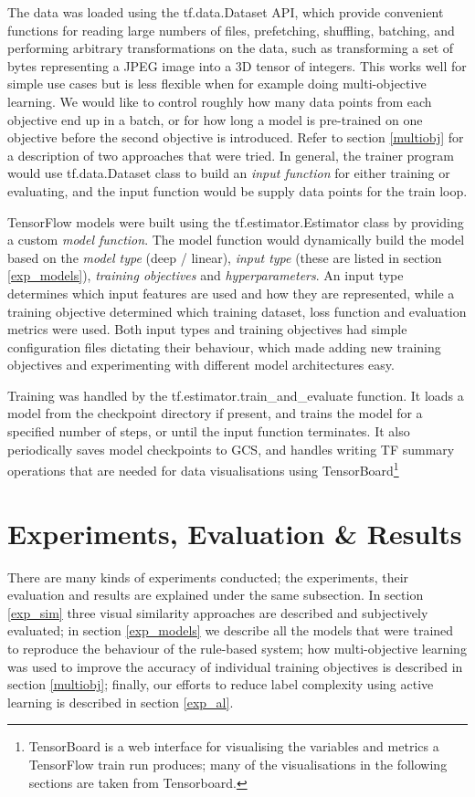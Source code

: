 The data was loaded using the tf.data.Dataset API, which provide convenient functions for reading large numbers of files, prefetching, shuffling, batching, and performing arbitrary transformations on the data, such as transforming a set of bytes representing a JPEG image into a 3D tensor of integers.
This works well for simple use cases but is less flexible when for example doing multi-objective learning.
We would like to control roughly how many data points from each objective end up in a batch, or for how long a model is pre-trained on one objective before the second objective is introduced.
Refer to section \ref{multiobj} for a description of two approaches that were tried.
In general, the trainer program would use tf.data.Dataset class to build an \textit{input function} for either training or evaluating, and the input function would be supply data points for the train loop.

TensorFlow models were built using the tf.estimator.Estimator class by providing a custom \textit{model function}.
The model function would dynamically build the model based on the \textit{model type} (deep / linear), \textit{input type} (these are listed in section \ref{exp_models}), \textit{training objectives} and \textit{hyperparameters}.
An input type determines which input features are used and how they are represented, while a training objective determined which training dataset, loss function and evaluation metrics were used.
Both input types and training objectives had simple configuration files dictating their behaviour, which made adding new training objectives and experimenting with different model architectures easy.

Training was handled by the tf.estimator.train\_and\_evaluate function.
It loads a model from the checkpoint directory if present, and trains the model for a specified number of steps, or until the input function terminates.
It also periodically saves model checkpoints to GCS, and handles writing TF summary operations that are needed for data visualisations using TensorBoard\footnote{TensorBoard is a web interface for visualising the variables and metrics a TensorFlow train run produces; many of the visualisations in the following sections are taken from Tensorboard.}

\section{Experiments, Evaluation \& Results}
\label{exp}

There are many kinds of experiments conducted; the experiments, their evaluation and results are explained under the same subsection.
In section \ref{exp_sim} three visual similarity approaches are described and subjectively evaluated;
in section \ref{exp_models} we describe all the models that were trained to reproduce the behaviour of the rule-based system;
how multi-objective learning was used to improve the accuracy of individual training objectives is described in section \ref{multiobj};
finally, our efforts to reduce label complexity using active learning is described in section \ref{exp_al}.


